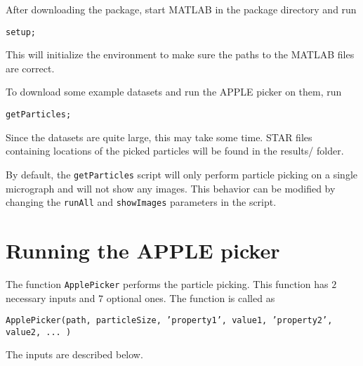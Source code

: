 \documentclass[12pt,a4paper]{article}
\begin{document}
After downloading the package, start MATLAB in the package directory and run
\begin{center}
\texttt{setup;}
\end{center}
This will initialize the environment to make sure the paths to the MATLAB files are correct.

To download some example datasets \cite{EMPIAR, betaGal, KLH} and run the APPLE picker on them, run
\begin{center}
\texttt{getParticles;}
\end{center}
Since the datasets are quite large, this may take some time. STAR files containing locations of the picked particles will be found in the \textsf{results/} folder.

By default, the \texttt{getParticles} script will only perform particle picking on a single micrograph and will not show any images. This behavior can be modified by changing the \texttt{runAll} and \texttt{showImages} parameters in the script.

\section{Running the APPLE picker}

The function \texttt{ApplePicker} performs the particle picking. This function has $2$ necessary inputs and $7$ optional ones. The function is called as
\begin{center}
\texttt{ApplePicker(path, particleSize, 'property1', value1, 'property2', value2, ... )}
\end{center}
The inputs are described below.
\end{document}
